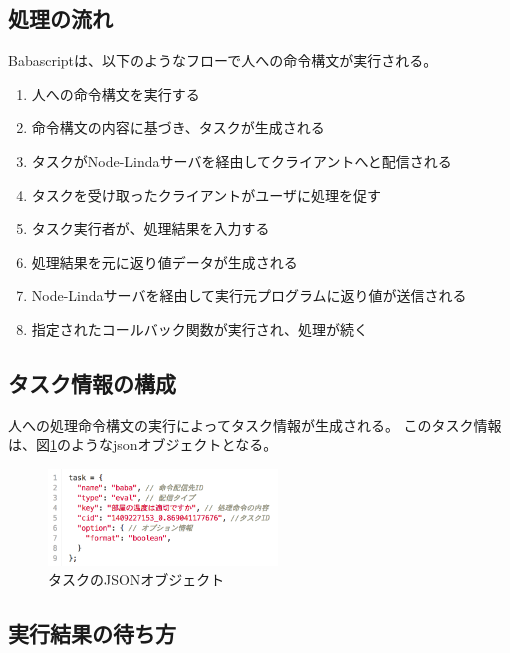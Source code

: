 \subsection{処理の流れ}\label{ux51e6ux7406ux306eux6d41ux308c}

Babascriptは、以下のようなフローで人への命令構文が実行される。

\begin{enumerate}
\def\labelenumi{\arabic{enumi}.}
\itemsep1pt\parskip0pt
\item
  人への命令構文を実行する
\item
  命令構文の内容に基づき、タスクが生成される
\item
  タスクがNode-Lindaサーバを経由してクライアントへと配信される
\item
  タスクを受け取ったクライアントがユーザに処理を促す
\item
  タスク実行者が、処理結果を入力する
\item
  処理結果を元に返り値データが生成される
\item
  Node-Lindaサーバを経由して実行元プログラムに返り値が送信される
\item
  指定されたコールバック関数が実行され、処理が続く
\end{enumerate}

\subsection{タスク情報の構成}\label{ux30bfux30b9ux30afux60c5ux5831ux306eux69cbux6210}

人への処理命令構文の実行によってタスク情報が生成される。
このタスク情報は、図\ref{task}のようなjsonオブジェクトとなる。

\begin{figure}[!h]
  \includegraphics[width=230px]{./images/task.png}
  \caption{タスクのJSONオブジェクト}  
  \label{task}
\end{figure}

\subsection{実行結果の待ち方}\label{ux5b9fux884cux7d50ux679cux306eux5f85ux3061ux65b9}

